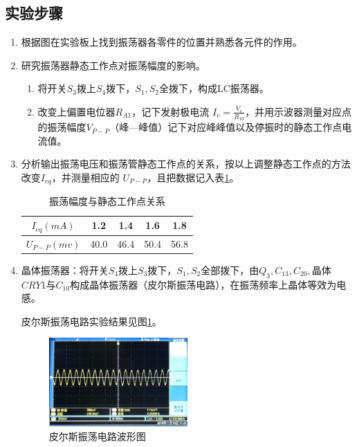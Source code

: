 \documentclass[12pt]{article}%
\numberwithin{equation}{section}
\begin{document}
\subsection{实验步骤}
\begin{enumerate}\addtolength{\itemsep}{-1.5ex}
\item 根据图在实验板上找到振荡器各零件的位置并熟悉各元件的作用。
\item 研究振荡器静态工作点对振荡幅度的影响。
\begin{enumerate}[1)]\addtolength{\itemsep}{-1.5ex}
\item 将开关$S_3$拨上$S_4$拨下，$S_1,S_2$全拨下，构成LC振荡器。
\item 改变上偏置电位器$R_{A1}$，记下发射极电流 $I_e=\frac{V_e}{R_{10}}$，并用示波器测量对应点的振荡幅度$V_{P-P}$（峰—峰值）记下对应峰峰值以及停振时的静态工作点电流值。
\end{enumerate}
\item 分析输出振荡电压和振荡管静态工作点的关系，按以上调整静态工作点的方法改变$I_{eq}$，并测量相应的 $U_{P-P}$，且把数据记入表\ref{tab1}。
\begin{table}[ht]
\centering
\caption{振荡幅度与静态工作点关系}
\label{tab1}
\begin{tabular}{|c|c|c|c|c|}
\hline
$I_{eq}(mA)$  & 1.2  & 1.4  & 1.6  & 1.8  \\ \hline
$U_{P-P}(mv)$ & 40.0 & 46.4 & 50.4 & 56.8 \\ \hline
\end{tabular}
\end{table}
\item 晶体振荡器：将开关$S_4$拨上$S_3$拨下，$S_ 1,S_2$全部拨下，由$Q_3,C_{13},C_{20},$晶体$CRY1$与$C_{10}$构成晶体振荡器（皮尔斯振荡电路），在振荡频率上晶体等效为电感。\par
皮尔斯振荡电路实验结果见图\ref{img212}。
 \begin{figure}[ht]
  \centering
  \includegraphics[width=0.5\textwidth]{gaopin1/gaopin114.jpg} 
  \caption{ 皮尔斯振荡电路波形图} 
  \label{img212} 
\end{figure}
\end{enumerate}
\end{document}
